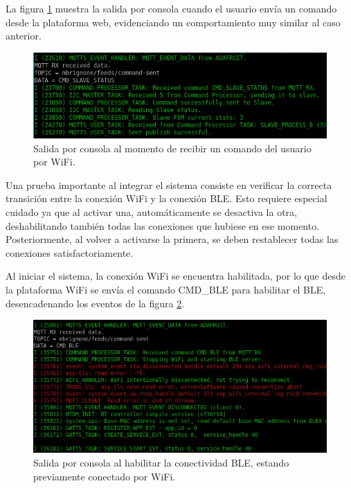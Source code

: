 La figura \ref{fig:output_rx_command} muestra la salida por consola cuando el usuario envía un comando desde la plataforma web, evidenciando un comportamiento muy similar al caso anterior.

\begin{figure}[h]
\centering
\includegraphics[width=\textwidth]{./Figures/output_rx_command.png}
\caption{Salida por consola al momento de recibir un comando del usuario por WiFi.}
\label{fig:output_rx_command}
\end{figure}

Una prueba importante al integrar el sistema consiste en verificar la correcta transición entre la conexión WiFi y la conexión BLE. Esto requiere especial cuidado ya que al activar una, automáticamente se desactiva la otra, deshabilitando también todas las conexiones que hubiese en ese momento. Posteriormente, al volver a activarse la primera, se deben restablecer todas las conexiones satisfactoriamente.

Al iniciar el sistema, la conexión WiFi se encuentra habilitada, por lo que desde la plataforma WiFi se envía el comando CMD\_BLE para habilitar el BLE, desencadenando los eventos de la figura \ref{fig:output_enable_ble}.

\begin{figure}[h]
\centering
\includegraphics[width=\textwidth]{./Figures/output_enable_ble.png}
\caption{Salida por consola al habilitar la conectividad BLE, estando previamente conectado por WiFi.}
\label{fig:output_enable_ble}
\end{figure}

